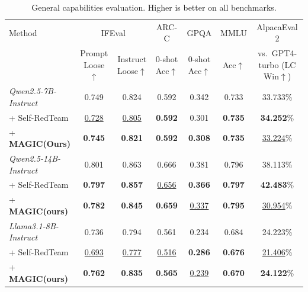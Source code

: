 \documentclass[11pt, letterpaper]{template}
\theoremstyle{plain}
\theoremstyle{definition}
\theoremstyle{remark}
\begin{document}
\begin{table}[t]
\centering
\caption{General capabilities evaluation. Higher is better on all benchmarks.}
\label{tab:general_cap}
\setlength{\tabcolsep}{4pt}
\renewcommand{\arraystretch}{1.12}
\scriptsize
\begin{tabular}{lcccccc}
\toprule
Method
& \multicolumn{2}{c}{IFEval}
& ARC-C
& GPQA
& MMLU

& AlpacaEval 2  \\
\cmidrule(lr){2-3}\cmidrule(lr){4-4}\cmidrule(lr){5-5}\cmidrule(lr){6-6}\cmidrule(lr){7-7}
& Prompt Loose$\uparrow$
& Instruct Loose$\uparrow$
& 0-shot Acc$\uparrow$
& 0-shot Acc$\uparrow$
& Acc$\uparrow$
& vs.\ GPT4-turbo (LC Win$\uparrow$) \\
\midrule
\textit{Qwen2.5-7B-Instruct} & 0.749 & 0.824 & 0.592 & 0.342 & 0.733 &  33.733\% \\
\quad + Self-RedTeam  & \underline{0.728} & \underline{0.805} & \textbf{0.592} & 0.301 & \textbf{0.735}  & \textbf{34.252}\% \\
\cellcolor{cyan!15}\quad + \textbf{MAGIC(Ours)} & \cellcolor{cyan!15}\textbf{0.745}  & \cellcolor{cyan!15}\textbf{0.821}  & \cellcolor{cyan!15}\textbf{0.592}  & \cellcolor{cyan!15}\textbf{0.308} & \cellcolor{cyan!15}\textbf{0.735}  &  \cellcolor{cyan!15}\underline{33.224}\% \\
\addlinespace[0.35em]
\textit{Qwen2.5-14B-Instruct} &0.801  &0.863  &0.666  &0.381  &0.796  &38.113\%  \\
\quad + Self-RedTeam & \textbf{0.797}  &\textbf{0.857}  &\underline{0.656}  &\textbf{0.366}  &\textbf{0.797}  &\textbf{42.483}\%  \\
\cellcolor{cyan!15}\quad + \textbf{MAGIC(ours)} &\cellcolor{cyan!15}\textbf{0.782}  &\cellcolor{cyan!15}\textbf{0.845}  &\cellcolor{cyan!15}\textbf{0.659}  &\cellcolor{cyan!15}\underline{0.337}  &\cellcolor{cyan!15}\textbf{0.795}  &\cellcolor{cyan!15}\underline{30.954}\%  \\
\addlinespace[0.35em]
\textit{Llama3.1-8B-Instruct} &0.736&	0.794&	0.561&	0.234&	0.684&	24.223\% \\
\quad + Self-RedTeam &\underline{0.693} &\underline{0.777} &\underline{0.516}& \textbf{0.286} & \textbf{0.676}& \underline{21.406}\% \\
\cellcolor{cyan!15}\quad + \textbf{MAGIC(ours)}& \cellcolor{cyan!15}\textbf{0.762} & \cellcolor{cyan!15}\textbf{0.835} &	\cellcolor{cyan!15}\textbf{0.565}&	\cellcolor{cyan!15}\underline{0.239} & \cellcolor{cyan!15}\textbf{0.670} &	\cellcolor{cyan!15}\textbf{24.122}\%  \\
\bottomrule
\end{tabular}
\end{table}
\end{document}
